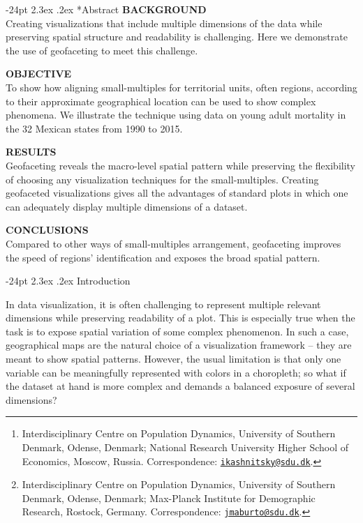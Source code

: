 \documentclass[10pt, twoside, parskip=half]{article}
\title{\large\textbf{Geofaceting -- align small-multiples for regions in a spatially meaningful way}\vskip 0em}
\author{\normalsize\textrm{\textbf{Ilya Kashnitsky\footnote{Interdisciplinary Centre on Population Dynamics, University of Southern Denmark, Odense, Denmark; National Research University Higher School of Economics, Moscow, Russia. Correspondence: \href{mailto:ikashnitsky@sdu.dk}{\nolinkurl{ikashnitsky@sdu.dk}}.}}}\\\normalsize\textrm{\textbf{José Manuel Aburto\footnote{Interdisciplinary Centre on Population Dynamics, University of Southern Denmark, Odense, Denmark; Max-Planck Institute for Demographic Research, Rostock, Germany. Correspondence: \href{mailto:jmaburto@sdu.dk}{\nolinkurl{jmaburto@sdu.dk}}.}}}}
\date{\vspace{-5ex}}
\makeatletter
\renewcommand\section{\@startsection {section}{1}{\z@}%
                                   {-24pt}%
                                   {2.3ex \@plus.2ex}%
                                   {\normalfont\large\bfseries}}
\makeatother
\begin{document}
  \maketitle

\vspace*{-24pt}
\vspace*{5mm}
\setlength{\parskip}{0.5em}
\section*{Abstract}
  \noindent\textbf{BACKGROUND}\\
  Creating visualizations that include multiple dimensions of the data while preserving spatial structure and readability is challenging. Here we demonstrate the use of geofaceting to meet this challenge.
  \par
  \noindent\textbf{OBJECTIVE}\\
  To show how aligning small-multiples for territorial units, often regions, according to their approximate geographical location can be used to show complex phenomena. We illustrate the technique using data on young adult mortality in the 32 Mexican states from 1990 to 2015.
  \par
  \noindent\textbf{RESULTS}\\
  Geofaceting reveals the macro-level spatial pattern while preserving the flexibility of choosing any visualization techniques for the small-multiples. Creating geofaceted visualizations gives all the advantages of standard plots in which one can adequately display multiple dimensions of a dataset.
  \par
  \noindent\textbf{CONCLUSIONS}\\
  Compared to other ways of small-multiples arrangement, geofaceting improves the speed of regions' identification and exposes the broad spatial pattern.
  \par
\vspace*{12pt}

\setlength{\parskip}{0ex}

\newpage

\hypertarget{introduction}{%
\section{Introduction}\label{introduction}}

In data visualization, it is often challenging to represent multiple relevant dimensions while preserving readability of a plot. This is especially true when the task is to expose spatial variation of some complex phenomenon. In such a case, geographical maps are the natural choice of a visualization framework -- they are meant to show spatial patterns. However, the usual limitation is that only one variable can be meaningfully represented with colors in a choropleth; so what if the dataset at hand is more complex and demands a balanced exposure of several dimensions?
\end{document}
